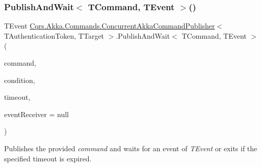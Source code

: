 \subsubsection{\texorpdfstring{Publish\+And\+Wait$<$ T\+Command, T\+Event $>$()}{PublishAndWait< TCommand, TEvent >()}\hspace{0.1cm}{\footnotesize\ttfamily [6/6]}}
{\footnotesize\ttfamily T\+Event \hyperlink{classCqrs_1_1Akka_1_1Commands_1_1ConcurrentAkkaCommandPublisher}{Cqrs.\+Akka.\+Commands.\+Concurrent\+Akka\+Command\+Publisher}$<$ T\+Authentication\+Token, T\+Target $>$.Publish\+And\+Wait$<$ T\+Command, T\+Event $>$ (\begin{DoxyParamCaption}\item[{T\+Command}]{command,  }\item[{Func$<$ I\+Enumerable$<$ \hyperlink{interfaceCqrs_1_1Events_1_1IEvent}{I\+Event}$<$ T\+Authentication\+Token $>$$>$, T\+Event $>$}]{condition,  }\item[{Time\+Span}]{timeout,  }\item[{\hyperlink{interfaceCqrs_1_1Events_1_1IEventReceiver}{I\+Event\+Receiver}$<$ T\+Authentication\+Token $>$}]{event\+Receiver = {\ttfamily null} }\end{DoxyParamCaption})}



Publishes the provided {\itshape command}  and waits for an event of {\itshape T\+Event}  or exits if the specified timeout is expired. 


